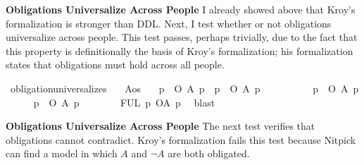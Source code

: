 \begin{isabellebody}
\begin{isamarkuptext}
\noindent \textbf{Obligations Universalize Across People}
I already showed above that Kroy's formalization is stronger than DDL. Next, I test whether or
not obligations universalize across people. This test passes, perhaps trivially, due to the fact that 
this property is definitionally the basis of Kroy's formalization; his formalization states
that obligations must hold across all people.%
\end{isamarkuptext}\isamarkuptrue%
\isamarkupfalse%
\ obligation{\isacharunderscore}universalizes{\isacharcolon}\isanewline
\ \ \ A{\isacharcolon}{\isacharcolon}os\isanewline
\ \ \ {\isachardoublequoteopen}{\isacharparenleft}{\isasymexists}p{\isachardot}\ {\isasymTurnstile}\ O\ {\isacharbraceleft}\isactrlbold {\isasymnot}{\isacharparenleft}A\ p{\isacharparenright}{\isacharbraceright}{\isacharparenright}\ {\isasymlongrightarrow}\ {\isacharparenleft}{\isasymforall}p{\isachardot}\ {\isasymTurnstile}\ O\ {\isacharbraceleft}\isactrlbold {\isasymnot}{\isacharparenleft}A\ p{\isacharparenright}{\isacharbraceright}{\isacharparenright}{\isachardoublequoteclose}\isanewline
%
\isadelimproof
\ \ %
\endisadelimproof
%
\isatagproof
{}\isamarkupfalse%
\ \isanewline
\ \ \ \ \isamarkupfalse%
\ {\isachardoublequoteopen}{\isacharparenleft}{\isasymexists}p{\isachardot}\ {\isasymTurnstile}\ O\ {\isacharbraceleft}\isactrlbold {\isasymnot}{\isacharparenleft}A\ p{\isacharparenright}{\isacharbraceright}{\isacharparenright}{\isachardoublequoteclose}\isanewline
\ \ \ \ \isamarkupfalse%
\ {\isachardoublequoteopen}{\isacharparenleft}{\isasymforall}p{\isachardot}\ {\isasymTurnstile}\ O\ {\isacharbraceleft}\isactrlbold {\isasymnot}{\isacharparenleft}A\ p{\isacharparenright}{\isacharbraceright}{\isacharparenright}{\isachardoublequoteclose}\isanewline
\ \ \ \ \ \ \isamarkupfalse%
\ FUL\ {\isacartoucheopen}{\isasymexists}p{\isachardot}\ {\isasymTurnstile}\isactrlemph O{\isacharbraceleft}\isactrlemph {\isasymnot}A{\isacharbraceright}\ p{\isacartoucheclose}\ \isamarkupfalse%
\ blast\isanewline
\ \ \isamarkupfalse%
\isanewline
%
%
\endisatagproof
{\isafoldproof}%
%
\isadelimproof
%
\endisadelimproof
%
\begin{isamarkuptext}%
\noindent \textbf{Obligations Universalize Across People} The next test verifies that obligations 
cannot contradict. Kroy's formalization fails this test
because Nitpick can find a model in which $A$ and $\neg A$ are both obligated.%

\end{isamarkuptext}
\end{isabellebody}
